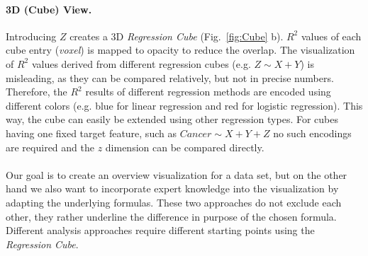 \documentclass[journal]{style/vgtc} 			          %
\begin{document}
\paragraph{3D (Cube) View.}
Introducing $Z$ creates a 3D \emph{Regression Cube} (Fig.~\ref{fig:Cube} b).
$R^2$ values of each cube entry (\emph{voxel}) is mapped to opacity to reduce the overlap.
The visualization of $R^2$ values derived from different regression cubes (e.g. $Z \sim X + Y$) is misleading, as they can be compared relatively, but not in precise numbers.
Therefore, the $R^2$ results of different regression methods are encoded using different colors (e.g. blue for linear regression and red for logistic regression).
This way, the cube can easily be extended using other regression types.
For cubes having one fixed target feature, such as $Cancer \sim X + Y + Z$ no such encodings are required and the $z$ dimension can be compared directly.
\\\\
Our goal is to create an overview visualization for a data set, but on the other hand we also want to incorporate expert knowledge into the visualization by adapting the underlying formulas.
These two approaches do not exclude each other, they rather underline the difference in purpose of the chosen formula.
Different analysis approaches require different starting points using the \emph{Regression Cube}.
\end{document}
